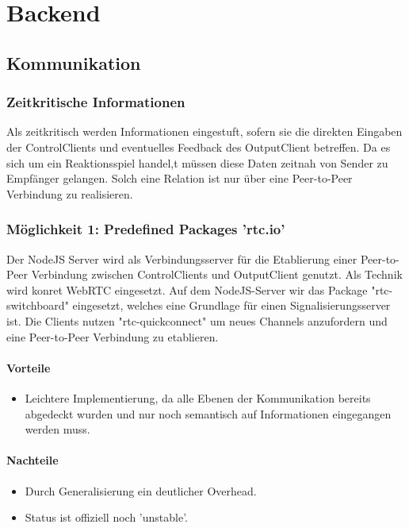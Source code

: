 \chapter{Backend}

\section{Kommunikation}

\subsection{Zeitkritische Informationen}
Als zeitkritisch werden Informationen eingestuft, sofern sie die direkten 
Eingaben der ControlClients und eventuelles Feedback des OutputClient betreffen. 
Da es sich um ein Reaktionsspiel handel,t müssen diese Daten zeitnah von Sender 
zu Empfänger gelangen. Solch eine Relation ist nur über eine Peer-to-Peer 
Verbindung zu realisieren.



\subsection{Möglichkeit 1: Predefined Packages 'rtc.io'}
Der NodeJS Server wird als Verbindungsserver für die Etablierung einer 
Peer-to-Peer Verbindung zwischen ControlClients und OutputClient genutzt. Als 
Technik wird konret WebRTC eingesetzt. Auf dem NodeJS-Server wir das Package 
"rtc-switchboard" eingesetzt, welches eine Grundlage für einen  
Signalisierungsserver ist. Die Clients nutzen "rtc-quickconnect" um neues 
Channels anzufordern und eine Peer-to-Peer Verbindung zu etablieren.

\subsubsection{Vorteile}
\begin{itemize}
\item
Leichtere Implementierung, da alle Ebenen der Kommunikation bereits abgedeckt 
wurden und nur noch semantisch auf Informationen eingegangen werden muss.
\end{itemize}

\subsubsection{Nachteile}
\begin{itemize}
\item
Durch Generalisierung ein deutlicher Overhead.

\item
Status ist offiziell noch 'unstable'.
\end{itemize}



